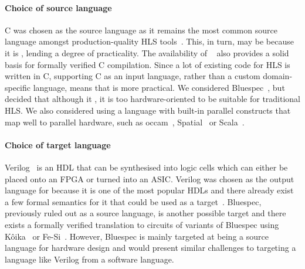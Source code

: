 \paragraph{Choice of source language}

C was chosen as the source language as it remains the most common source
language amongst production-quality HLS tools~\cite{canis13_l,
  amd23_vitis_high_synth, intel20_hsc, pilato13_bambu}. This, in turn, may be
because it is , lending a
degree of practicality.  The availability of
\compcert{}~\cite{leroy09_formal_verif_realis_compil} also provides a solid
basis for formally verified C compilation.  Since a lot of existing code for HLS
is written in C, supporting C as an input language, rather than a custom
domain-specific language, means that \vericert{} is more practical.  We
considered Bluespec~\cite{nikhil04_bsv}, but decided that although it
, it is too hardware-oriented to be suitable for traditional HLS.  We
also considered using a language with built-in parallel constructs that map well
to parallel hardware, such as occam~\cite{page91_compil_occam},
Spatial~\cite{koeplinger18_s} or Scala~\cite{bachrach12_chisel}.

\paragraph{Choice of target language}

Verilog~\cite{06_ieee_stand_veril_hardw_descr_languag} is an \gls{HDL} that can
be synthesised into logic cells which can either be placed onto an \gls{FPGA} or
turned into an \gls{ASIC}.  Verilog was chosen as the output language for
\vericert{} because it is one of the most popular HDLs and there already exist a
few formal semantics for it that could be used as a
target~\cite{lööw19_verif_compil_verif_proces, meredith10_veril}.  Bluespec,
previously ruled out as a source language, is another possible target and there
exists a formally verified translation to circuits of variants of Bluespec using
K\^{o}ika~\cite{bourgeat20_essen_blues} or
Fe-Si~\cite{braibant13_formal_verif_hardw_synth}.  However, Bluespec is mainly
targeted at being a source language for hardware design and would present
similar challenges to targeting a language like Verilog from a software
language.

